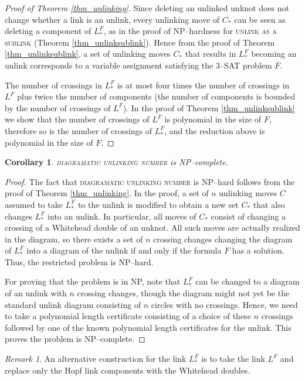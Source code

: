 \documentclass[12pt]{amsart}
\newtheorem{corr}[thm]{Corollary}
\theoremstyle{definition}
\theoremstyle{remark}
\newtheorem{rem}[thm]{Remark}
\begin{document}
\begin{proof}[Proof of Theorem \ref{thm_unlinking}]
Since deleting an unlinked unknot does not change whether a link is an unlink, every unlinking move of $C_*$ can be seen as deleting a component of $L_*^F$, as in the proof of NP--hardness for \textsc{unlink as a sublink} (Theorem \ref{thm_unlinksublink}).
Hence from the proof of Theorem \ref{thm_unlinksublink}, a set of unlinking moves $C_*$ that results in $L_*^F$ becoming an unlink corresponds to a variable assignment satisfying the 3--\textsc{SAT} problem $F$.

The number of crossings in $L_*^F$ is at most four times the number of crossings in $L^F$ plus twice the number of components (the number of components is bounded by the number of crossings of $L^F$).
In the proof of Theorem \ref{thm_unlinksublink} we show that the number of crossings of $L^F$ is polynomial in the size of $F$, therefore so is the number of crossings of $L^F_*$, and the reduction above is polynomial in the size of $F$.
\end{proof}

\begin{corr}
\textsc{diagramatic unlinking number} is NP--complete.
\end{corr}
\begin{proof}
The fact that \textsc{diagramatic unlinking number} is NP--hard follows from the proof of Theorem \ref{thm_unlinking}.
In the proof, a set of $n$ unlinking moves $C$ assumed to take $L_*^F$ to the unlink is modified to obtain a new set $C_*$ that also changes $L_*^F$ into an unlink.
In particular, all moves of $C_*$ consist of changing a crossing of a Whitehead double of an unknot.
All such moves are actually realized in the diagram, so there exists a set of $n$ crossing changes changing the diagram of $L_*^F$ into a diagram of the unlink if and only if the formula $F$ has a solution.
Thus, the restricted problem is NP--hard.

For proving that the problem is in NP, note that $L_*^F$ can be changed to a diagram of an unlink with $n$ crossing changes, though the diagram might not yet be the standard unlink diagram consisting of $n$ circles with no crossings.
Hence, we need to take a polynomial length certificate consisting of a choice of these $n$ crossings followed by one of the known polynomial length certificates for the unlink.
This proves the problem is NP--complete.
\end{proof}

\begin{rem}
  An alternative construction for the link $L^F_*$ is to take the link $L^F$ and replace only the Hopf link components with the Whitehead doubles.


\end{rem}
\end{document}
